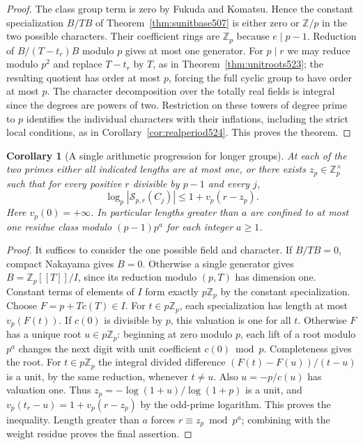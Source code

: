 \documentclass[a4paper,11pt]{article}
\newtheorem{corollary}[proposition]{Corollary}
\theoremstyle{definition}
\theoremstyle{remark}
\newcommand{\ZZ}{\mathbb Z}\newcommand{\ord}{\operatorname{ord}}
\numberwithin{equation}{section}
\begin{document}
\begin{proof}
The class group term is zero by Fukuda and Komatsu. Hence the
constant specialization \(B/TB\) of Theorem~\ref{thm:sunitbase507}
is either zero or \(\ZZ/p\) in the two possible characters. Their
coefficient rings are \(\ZZ_p\) because \(e\mid p-1\). Reduction of
\(B/(T-t_r)B\) modulo \(p\) gives at most one generator. For \(p\mid r\)
we may reduce modulo \(p^2\) and replace \(T-t_r\) by \(T\), as in
Theorem~\ref{thm:unitroots523}; the resulting quotient has order at
most \(p\), forcing the full cyclic group to have order at most \(p\).
The character decomposition over the totally real fields is integral
since the degrees are powers of two. Restriction on these towers of
degree prime to \(p\) identifies the individual characters with their
inflations, including the strict local conditions, as in
Corollary~\ref{cor:realperiod524}. This proves the theorem.
\end{proof}

\begin{corollary}[A single arithmetic progression for longer groups]
\leavevmode\label{cor:dyadicdepth525}
At each of the two primes either all indicated lengths are at most
one, or there exists \(z_p\in\ZZ_p^\times\) such that for every
positive \(r\) divisible by \(p-1\) and every \(j\),
\[
       \log_p|\mathcal S_{p,r}(C_j)|\le 1+v_p(r-z_p).
\]
Here \(v_p(0)=+\infty\). In particular lengths greater than \(a\)
are confined to at most one residue class modulo \((p-1)p^a\)
for each integer \(a\ge1\).
\end{corollary}
\begin{proof}
It suffices to consider the one possible field and character.
If \(B/TB=0\), compact Nakayama gives \(B=0\). Otherwise a single
generator gives \(B=\ZZ_p[[T]]/I\), since its reduction modulo
\((p,T)\) has dimension one. Constant terms of elements of \(I\)
form exactly \(p\ZZ_p\) by the constant specialization. Choose
\(F=p+T c(T)\in I\). For \(t\in p\ZZ_p\), each specialization has
length at most \(v_p(F(t))\). If \(c(0)\) is divisible by \(p\), this
valuation is one for all \(t\). Otherwise \(F\) has a unique root
\(u\in p\ZZ_p\): beginning at zero modulo \(p\), each lift of a
root modulo \(p^a\) changes the next digit with unit coefficient
\(c(0)\bmod p\). Completeness gives the root. For \(t\in p\ZZ_p\)
the integral divided difference \((F(t)-F(u))/(t-u)\) is a unit,
by the same reduction, whenever \(t\ne u\). Also \(u=-p/c(u)\)
has valuation one. Thus \(z_p=-\log(1+u)/\log(1+p)\) is a unit,
and \(v_p(t_r-u)=1+v_p(r-z_p)\) by the odd-prime logarithm. This
proves the inequality. Length greater than \(a\) forces
\(r\equiv z_p\bmod p^a\); combining with the weight residue proves
the final assertion.
\end{proof}
\end{document}
